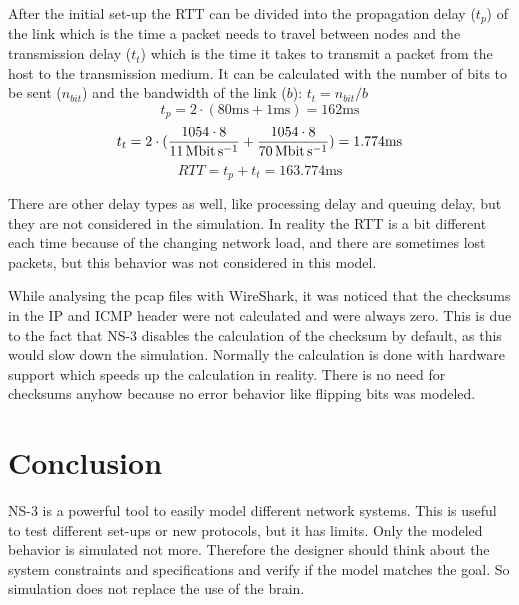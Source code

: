 \documentclass[parskip=full]{scrartcl}
\begin{document}
After the initial set-up the RTT can be divided into the propagation delay ($ t_p $) of the link which is the time a packet needs to travel between nodes and the transmission delay ($ t_t $) which is the time it takes to transmit a packet from the host to the transmission medium.  It can be calculated with the number of bits to be sent ($n_{bit}$) and the bandwidth of the link ($b$): $ t_t = n_{bit}/b$
\[t_p = 2\cdot(80 \si{\milli\second}+1 \si{\milli\second}) = 162 \si{\milli\second} \]
\[t_t = 2\cdot(\frac{1054\cdot8}{\SI{11}{\mega\bit\per\second}} +\frac{1054\cdot8}{\SI{70}{\mega\bit\per\second}}) = 1.774 \si{\milli\second} \]
\[ RTT = t_p + t_t = 163.774 \si{\milli\second} \]

There are other delay types as well, like processing delay and queuing delay, but they are not considered in the simulation. 
In reality the RTT is a bit different each time because of the changing network load, and there are sometimes lost packets,  but this behavior was not considered in this model.

While analysing the pcap files with WireShark, it was noticed that the checksums in the IP and ICMP header were not calculated and were always zero. 
This is due to the fact that NS-3 disables the calculation of the checksum by default, as this would slow down the simulation.
Normally the calculation is done with hardware support which speeds up the calculation in reality. 
There is no need for checksums anyhow because no error behavior like flipping bits was modeled.



\section{Conclusion}
NS-3 is a powerful tool to easily model different network systems. This is useful to test different set-ups or new protocols, but it has limits.
Only the modeled behavior is simulated not more. Therefore the designer should think about the system constraints and specifications and verify if the model matches the goal. So simulation does not replace the use of the brain.



\printbibliography
\end{document}
